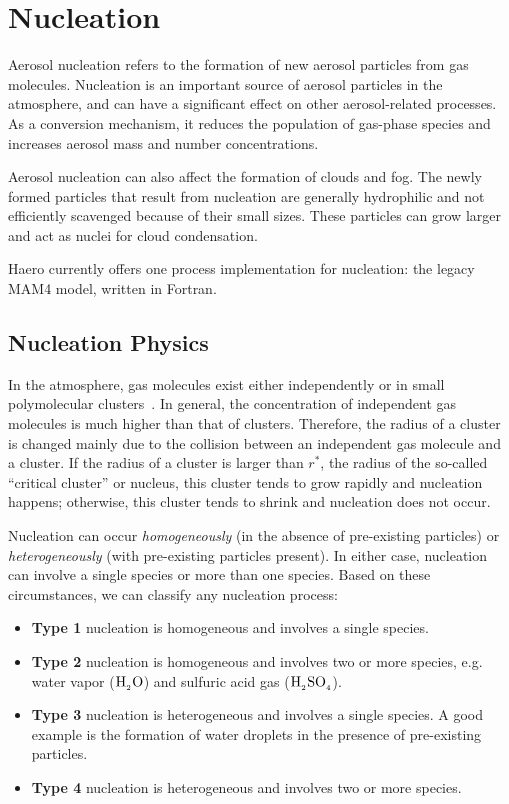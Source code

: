 \section{Nucleation}

Aerosol nucleation refers to the formation of new aerosol particles from gas
molecules. Nucleation is an important source of aerosol particles in the
atmosphere, and can have a significant effect on other aerosol-related
processes. As a conversion mechanism, it reduces the population of gas-phase
species and increases aerosol mass and number concentrations.

Aerosol nucleation can also affect the formation of clouds and fog. The newly
formed particles that result from nucleation are generally hydrophilic and not
efficiently scavenged because of their small sizes. These particles can
grow larger and act as nuclei for cloud condensation.

Haero currently offers one process implementation for nucleation: the legacy
MAM4 model, written in Fortran.

\subsection{Nucleation Physics}

In the atmosphere, gas molecules exist either independently or in small
polymolecular clusters~\cite{seinfeld-2006-acp}. In general, the concentration
of independent gas molecules is much higher than that of clusters. Therefore,
the radius of a cluster is changed mainly due to the collision between an
independent gas molecule and a cluster. If the radius of a cluster is larger
than $r^*$, the radius of the so-called ``critical cluster'' or nucleus, this
cluster tends to grow rapidly and nucleation happens; otherwise, this cluster
tends to shrink and nucleation does not occur.

Nucleation can occur {\em homogeneously} (in the absence of pre-existing
particles) or {\em heterogeneously} (with pre-existing particles present).
In either case, nucleation can involve a single species or more than one species.
Based on these circumstances, we can classify any nucleation process:

\begin{itemize}
  \item {\bf Type 1} nucleation is homogeneous and involves a single species.
  \item {\bf Type 2} nucleation is homogeneous and involves two or more species,
        e.g. water vapor ($\rm H_{_2}O$) and sulfuric acid gas ($\rm H_{_2}SO_{_4}$).
  \item {\bf Type 3} nucleation is heterogeneous and involves a single species.
        A good example is the formation of water droplets in the presence of
        pre-existing particles.
  \item {\bf Type 4} nucleation is heterogeneous and involves two or more
        species.
\end{itemize}

